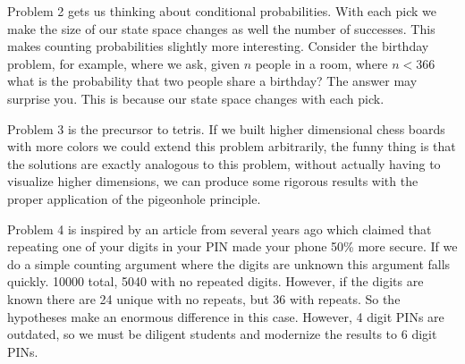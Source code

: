 \documentclass[16 pt]{amsart}
\theoremstyle{definition}
\theoremstyle{remark}
\numberwithin{equation}{subsection}
\begin{document}
Problem 2 gets us thinking about conditional probabilities.  With each pick we make the size of our state space changes as well the number of successes.  This makes counting probabilities slightly more interesting.  Consider the birthday problem, for example, where we ask, given $n$ people in a room, where $n<366$ what is the probability that two people share a birthday?  The answer may surprise you.  This is because our state space changes with each pick.

Problem 3 is the precursor to tetris.  If we built higher dimensional chess boards with more colors we could extend this problem arbitrarily,  the funny thing is that the solutions are exactly analogous to this problem, without actually having to visualize higher dimensions, we can produce some rigorous results with the proper application of the pigeonhole principle.  

Problem 4 is inspired by an article from several years ago which claimed that repeating one of your digits in your PIN made your phone 50\% more secure.  If we do a simple counting argument where the digits are unknown this argument falls quickly.  10000 total, 5040 with no repeated digits.  However, if the digits are known there are 24 unique with no repeats, but 36 with repeats.  So the hypotheses make an enormous difference in this case.  However, 4 digit PINs are outdated, so we must be diligent students and modernize the results to 6 digit PINs.
\end{document}
